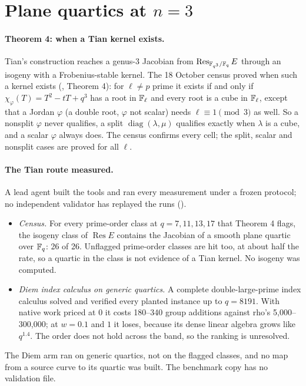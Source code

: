 \section{Plane quartics at $n=3$}\label{sec:jac-quartic}

\paragraph{Theorem 4: when a Tian kernel exists.} Tian's construction
reaches a genus-3 Jacobian from $\operatorname{Res}_{\mathbb{F}_{q^3}/\mathbb{F}_q}E$ through
an isogeny with a Frobenius-stable kernel. The 18 October census proved when
such a kernel exists (,
Theorem 4): for $\ell\ne p$ prime it exists if and only if
$\chi_\varphi(T)=T^2-tT+q^3$ has a root in $\mathbb{F}_\ell$ and every root is a
cube in $\mathbb{F}_\ell$, except that a Jordan $\varphi$ (a double root, $\varphi$ not
scalar) needs $\ell\equiv1\pmod3$ as well. So a nonsplit $\varphi$ never
qualifies, a split $\operatorname{diag}(\lambda,\mu)$ qualifies exactly when
$\lambda$ is a cube, and a scalar $\varphi$ always does. The census confirms
every cell; the split, scalar and nonsplit cases are proved for all $\ell$.

\paragraph{The Tian route measured.} A lead agent built the tools and ran
every measurement under a frozen protocol; no independent validator has
replayed the runs ().
\begin{itemize}
\item \emph{Census.} For every prime-order class at $q=7,11,13,17$ that
  Theorem 4 flags, the isogeny class of $\operatorname{Res}E$ contains the
  Jacobian of a smooth plane quartic over $\mathbb{F}_q$: 26 of 26. Unflagged
  prime-order classes are hit too, at about half the rate, so a quartic in
  the class is not evidence of a Tian kernel. No isogeny was computed.
\item \emph{Diem index calculus on generic quartics.} A complete
  double-large-prime index calculus solved and verified every planted
  instance up to $q=8191$. With native work priced at 0 it costs 180--340
  group additions against rho's 5{,}000--300{,}000; at $w=0.1$ and $1$ it
  loses, because its dense linear algebra grows like $q^{1.4}$. The order
  does not hold across the band, so the ranking is unresolved.
\end{itemize}
The Diem arm ran on generic quartics, not on the flagged classes, and no
map from a source curve to its quartic was built. The benchmark copy
 has no validation file.

